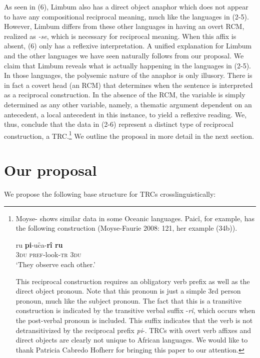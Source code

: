 \documentclass[output=paper]{langsci/langscibook}
\begin{document}
As seen in (6), Limbum also has a direct object anaphor which does not appear to have any compositional reciprocal meaning, much like the languages in (2-5). However, Limbum differs from these other languages in having an overt RCM, realized as \textit{-se}, which is necessary for reciprocal meaning. When this affix is absent, (6) only has a reflexive interpretation. A unified explanation for Limbum and the other languages we have seen naturally follows from our proposal. We claim that Limbum reveals what is actually happening in the languages in (2-5). In those languages, the polysemic nature of the anaphor is only illusory. There is in fact a covert head (an RCM) that determines when the sentence is interpreted as a reciprocal construction. In the absence of the RCM, the variable is simply determined as any other variable, namely, a thematic argument dependent on an antecedent, a local antecedent in this instance, to yield a reflexive reading. We, thus, conclude that the data in (2-6) represent a distinct type of reciprocal construction, a TRC.\footnote{ Moyse-\citet{Faurie2008} shows similar data in some Oceanic languages. Paicî, for example, has the following construction (Moyse-Faurie 2008: 121, her example (34b)).

\ea
\gll  ru  \textbf{pi}-uc̑a-\textbf{rî  ru}\\
 \textsc{3du}  \textsc{pref}-look-\textsc{tr}  \textsc{3du}\\
\glt  ‘They observe each other.’
\z

This reciprocal construction requires an obligatory verb prefix as well as the direct object pronoun. Note that this pronoun is just a simple 3rd person pronoun, much like the subject pronoun. The fact that this is a transitive construction is indicated by the transitive verbal suffix -\textit{rî}, which occurs when the post-verbal pronoun is included. This suffix indicates that the verb is not detransitivized by the reciprocal prefix \textit{pi}-. TRCs with overt verb affixes and direct objects are clearly not unique to African languages. We would like to thank Patricia Cabredo Hofherr for bringing this paper to our attention.} We outline the proposal in more detail in the next section.

\section{Our proposal} 

We propose the following base structure for TRCs crosslinguistically:
\end{document}
